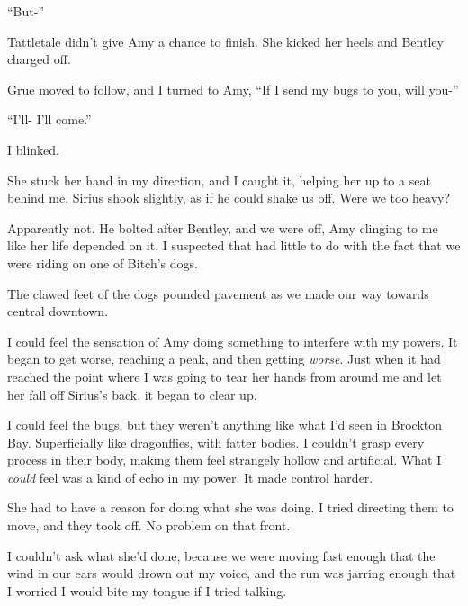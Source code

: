``But-''



Tattletale didn't give Amy a chance to finish.  She kicked her heels and Bentley charged off.



Grue moved to follow, and I turned to Amy, ``If I send my bugs to you, will you-''



``I'll-  I'll come.''



I blinked.



She stuck her hand in my direction, and I caught it, helping her up to a seat behind me.  Sirius shook slightly, as if he could shake us off.  Were we too heavy?



Apparently not.  He bolted after Bentley, and we were off, Amy clinging to me like her life depended on it.  I suspected that had little to do with the fact that we were riding on one of Bitch's dogs.



The clawed feet of the dogs pounded pavement as we made our way towards central downtown.



I could feel the sensation of Amy doing something to interfere with my powers.  It began to get worse, reaching a peak, and then getting \emph{worse}.  Just when it had reached the point where I was going to tear her hands from around me and let her fall off Sirius's back, it began to clear up.



I could feel the bugs, but they weren't anything like what I'd seen in Brockton Bay.  Superficially like dragonflies, with fatter bodies.  I couldn't grasp every process in their body, making them feel strangely hollow and artificial.  What I \emph{could} feel was a kind of echo in my power.  It made control harder.



She had to have a reason for doing what she was doing.  I tried directing them to move, and they took off.  No problem on that front.



I couldn't ask what she'd done, because we were moving fast enough that the wind in our ears would drown out my voice, and the run was jarring enough that I worried I would bite my tongue if I tried talking.



